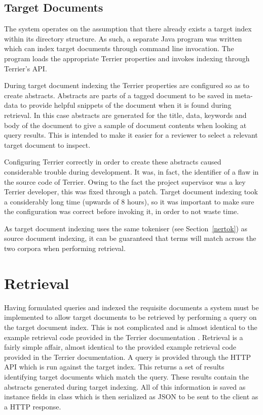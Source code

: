 \documentclass{l4proj}
\begin{document}
\subsection{Target Documents}
The system operates on the assumption that there already exists a target index within its directory structure.
As such, a separate Java program was written which can index target documents through command line invocation. The program loads the appropriate Terrier properties and invokes indexing through Terrier's API.

During target document indexing the Terrier properties are configured so as to create abstracts. Abstracts are parts of a tagged document to be saved in meta-data to provide helpful snippets of the document when it is found during retrieval. In this case abstracts are generated for the title, data, keywords and body of the document to give a sample of document contents when looking at query results. This is intended to make it easier for a reviewer to select a relevant target document to inspect.

Configuring Terrier correctly in order to create these abstracts caused considerable trouble during development. It was, in fact, the identifier of a flaw in the source code of Terrier. Owing to the fact the project supervisor was a key Terrier developer, this was fixed through a patch. Target document indexing took a considerably long time (upwards of 8 hours), so it was important to make sure the configuration was correct before invoking it, in order to not waste time.

As target document indexing uses the same tokeniser (see Section~\ref{nertok}) as source document indexing, it can be guaranteed that terms will match across the two corpora when performing retrieval.

\section{Retrieval}
Having formulated queries and indexed the requisite documents a system must be implemented to allow target documents to be retrieved by performing a query on the target document index. This is not complicated and is almost identical to the example retrieval code provided in the Terrier documentation \cite{terrier_retrieval}.
Retrieval is a fairly simple affair, almost identical to the provided example retrieval code provided in the Terrier documentation.
A query is provided through the HTTP API which is run against the target index. This returns a set of results identifying target documents which match the query. These results contain the abstracts generated during target indexing. All of this information is saved as instance fields in class which is then serialized as JSON to be sent to the client as a HTTP response.
\end{document}
